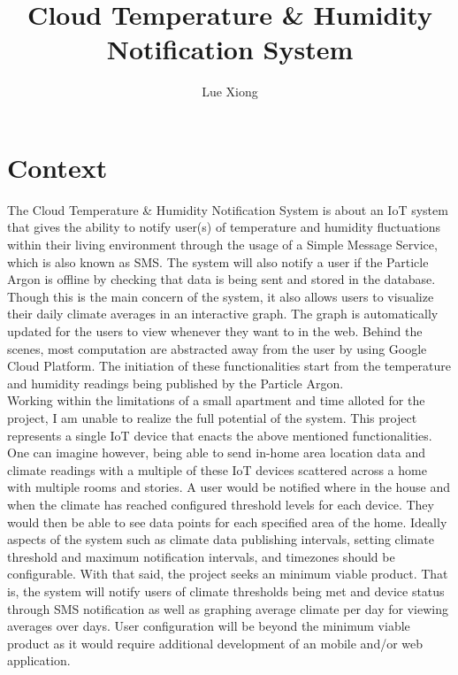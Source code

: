 \documentclass{article}
\title{Cloud Temperature \& Humidity Notification System}
\author{Lue Xiong}
\begin{document}
\maketitle
\newpage

\tableofcontents
\newpage

\obeylines

\section{Context}
The Cloud Temperature \& Humidity Notification System is about an IoT system that gives the ability to notify user(s) of temperature and humidity fluctuations within their living environment through the usage of a Simple Message Service, which is also known as SMS. The system will also notify a user if the Particle Argon is offline by checking that data is being sent and stored in the database. Though this is the main concern of the system, it also allows users to visualize their daily climate averages in an interactive graph. The graph is automatically updated for the users to view whenever they want to in the web. Behind the scenes, most computation are abstracted away from the user by using Google Cloud Platform. The initiation of these functionalities start from the temperature and humidity readings being published by the Particle Argon.\\

Working within the limitations of a small apartment and time alloted for the project, I am unable to realize the full potential of the system. This project represents a single IoT device that enacts the above mentioned functionalities. One can imagine however, being able to send in-home area location data and climate readings with a multiple of these IoT devices scattered across a home with multiple rooms and stories. A user would be notified where in the house and when the climate has reached configured threshold levels for each device. They would then be able to see data points for each specified area of the home. Ideally aspects of the system such as climate data publishing intervals, setting climate threshold and maximum notification intervals, and timezones should be configurable. With that said, the project seeks an minimum viable product. That is, the system will notify users of climate thresholds being met and device status through SMS notification as well as graphing average climate per day for viewing averages over days. User configuration will be beyond the minimum viable product as it would require additional development of an mobile and/or web application.\\
\end{document}
